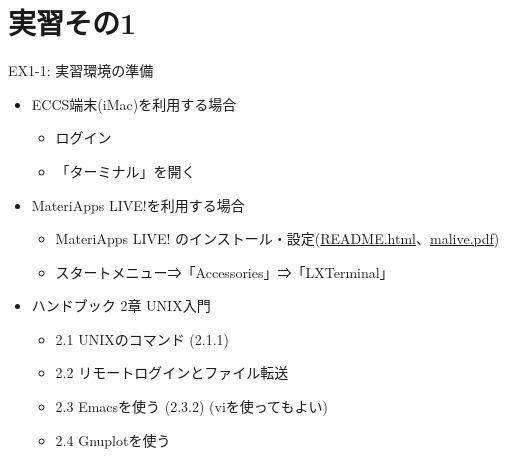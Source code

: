 \documentclass[dvipdfmx]{beamer}
\begin{document}
\section{実習その1}

\begin{frame}[t,fragile]{EX1-1: 実習環境の準備}
  \begin{itemize}
    \setlength{\itemsep}{1em}
  \item[1-1-1] ECCS端末(iMac)を利用する場合
    \begin{itemize}
    \item ログイン
    \item 「ターミナル」を開く
    \end{itemize}
  \item[1-1-2] MateriApps LIVE!を利用する場合
    \begin{itemize}
    \item MateriApps LIVE! のインストール・設定(\href{https://github.com/cmsi/MateriAppsLive/wiki/MateriAppsLive-ltx}{README.html}、\href{http://www.slideshare.net/cms_initiative/materiapps-live-52477264}{malive.pdf})
    \item スタートメニュー⇒「Accessories」⇒「LXTerminal」
    \end{itemize}
  \item[1-1-3] ハンドブック 2章 UNIX入門
    \begin{itemize}
    \item 2.1 UNIXのコマンド (2.1.1)
    \item 2.2 リモートログインとファイル転送
    \item 2.3 Emacsを使う (2.3.2) (viを使ってもよい)
    \item 2.4 Gnuplotを使う
    \end{itemize}
  \end{itemize}
\end{frame}
\end{document}
